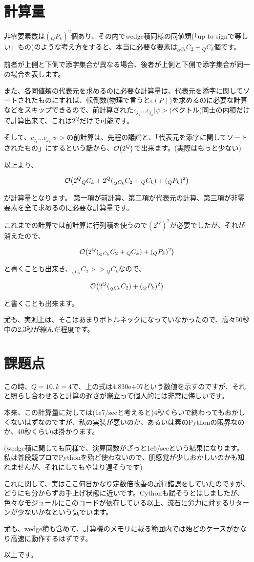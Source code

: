 \documentclass[a4paper, 10pt, dvipdfmx]{jlreq}
\begin{document}
\section{計算量}

非零要素数は$({}_Q P_k)^2$個あり、その内でwedge積同様の同値類(「up to signで等しい」もの)のような考え方をすると、本当に必要な要素は${}_{{}_Q C_k} C_2+{}_Q C_k$個です。

前者が上側と下側で添字集合が異なる場合、後者が上側と下側で添字集合が同一の場合を表します。

また、各同値類の代表元を求めるのに必要な計算量は、代表元を添字に関してソートされたものにすれば、転倒数(物理で言うと$\epsilon(P)$)を求めるのに必要な計算などをスキップできるので、前計算された$c_{j_1} ... c_{j_k} | \psi >$(ベクトル)同士の内積だけで計算出来て、これは$2^Q$だけで可能です。

そして、$c_{j_1} ... c_{j_k} | \psi >$の前計算は、先程の議論と、「代表元を添字に関してソートされたもの」にするという話から、$\order{2^Q}$で出来ます。(実際はもっと少ない)

以上より、

$$
    \order{2^Q {}_Q C_k + 2^Q({}_{{}_Q C_k} C_2+{}_Q C_k) + ({}_Q P_k)^2}
$$

が計算量となります。
第一項が前計算、第二項が代表元の計算、第三項が非零要素を全て求めるのに必要な計算量です。

これまでの計算では前計算に行列積を使うので$(2^Q)^2$が必要でしたが、それが消えたので、

$$
    \order{2^Q({}_{{}_Q C_k} C_2+{}_Q C_k) + ({}_Q P_k)^2}
$$

と書くことも出来き、${}_{{}_Q C_k} C_2 >> {}_Q C_k$なので、

$$
    \order{2^Q({}_{{}_Q C_k} C_2) + ({}_Q P_k)^2}
$$

と書くことも出来ます。

尤も、実測上は、そこはあまりボトルネックになっていなかったので、高々50秒中の2,3秒が縮んだ程度です。

\section{課題点}

この時、$Q=10,k=4$で、上の式は4.830e+07という数値を示すのですが、それと照らし合わせると計算の遅さが際立って個人的には非常に悔しいです。

本来、この計算量に対しては(1e7/secと考えると)4秒くらいで終わってもおかしくないはずなのですが、私の実装が悪いのか、あるいは素のPythonの限界なのか、40秒くらいは掛かります。

(wedge積に関しても同様で、演算回数がざっと1e6/secという結果になります。私は普段競プロでPythonを殆ど使わないので、肌感覚が少しおかしいのかも知れませんが、それにしてもやはり遅そうです)

これに関して、実はここ何日かなり定数倍改善の試行錯誤をしていたのですが、どうにも分からずお手上げ状態に近いです。Cythonも試そうとはしましたが、色々なモジュールにこのコードが依存している以上、流石に労力に対するリターンが少ないかなという気でいます。

尤も、wedge積も含めて、計算機のメモリに載る範囲内では殆どのケースがかなり高速に動作するはずです。

以上です。
\end{document}
